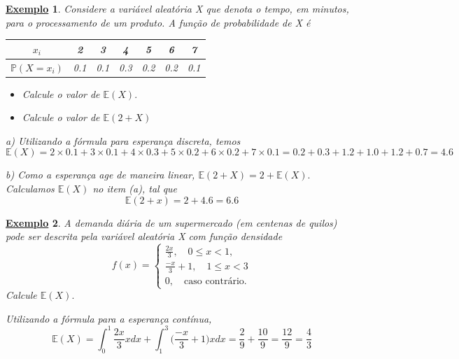 \documentclass{article}
\newtheorem{example}{\underline{Exemplo}}
\begin{document}
\begin{example}
  Considere a variável aleatória X que denota o tempo, em minutos, para o processamento de um produto. A função de probabilidade de X é 
  \begin{center}
    \begin{table}[h!]
      \centering
      \begin{tabular}{| c | c c c c c c |}
        \hline 
        \(x_{i}\) & 2 & 3 & 4 & 5 & 6 & 7\\
        \hline
        \(\mathbb{P}(X = x_{i})\) & 0.1 & 0.1 & 0.3 & 0.2 & 0.2 & 0.1\\
        \hline
      \end{tabular}
    \end{table}
  \end{center}
  \begin{itemize}
    \item[a)] Calcule o valor de \(\mathbb{E}(X).\)
    \item[b)] Calcule o valor de \(\mathbb{E}(2 + X)\)
  \end{itemize}

  a) Utilizando a fórmula para esperança discreta, temos 
  \[
    \mathbb{E}(X) = 2\times 0.1 + 3\times 0.1 + 4\times 0.3 + 5\times 0.2 + 6\times 0.2 + 7\times 0.1 = 0.2 + 0.3 + 1.2 + 1.0 + 1.2 + 0.7 = 4.6
  \]

  b) Como a esperança age de maneira linear, \(\mathbb{E}(2 + X) = 2 + \mathbb{E}(X).\) Calculamos \(\mathbb{E}(X)\) no item (a), tal que 
  \[
    \mathbb{E}(2+x) = 2 + 4.6 = 6.6
  \]
\end{example}
\begin{example}
  A demanda diária de um supermercado (em centenas de quilos) pode ser descrita pela variável aleatória X com função densidade 
  \[
    f(x) = \left\{\begin{array}{ll}
        \frac{2x}{3},\quad 0\leq x <1,\\
        \frac{-x}{3} + 1,\quad 1\leq x <3\\
        0,\quad \text{caso contrário}.
    \end{array}\right.
  \]
  Calcule \(\mathbb{E}(X).\)

  Utilizando a fórmula para a esperança contínua, 
  \[
    \mathbb{E}(X) = \int_{0}^{1}\frac{2x}{3}xdx + \int_{1}^{3}\biggl(\frac{-x}{3} + 1\biggr)xdx = \frac{2}{9} + \frac{10}{9} = \frac{12}{9} = \frac{4}{3} 
  \]
\end{example}
\end{document}

